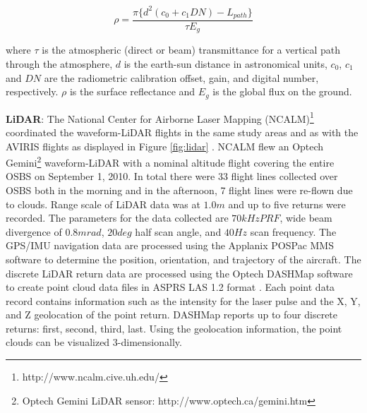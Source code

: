 \documentclass[remotesensing,article,accept,moreauthors,pdftex,12pt,a4paper]{mdpi}
\begin{document}
\begin{equation}
\rho =\frac{\pi \{ d^2 (c_0 + c_1 D N) - L_{path}\}}{\tau E_g}
\end{equation}

where $\tau$ is the atmospheric (direct or beam) transmittance for a vertical path through the atmosphere, $d$ is the earth-sun distance in astronomical units, $c_0$, $c_1$ and $ D N$ are the radiometric calibration offset, gain, and digital number, respectively. 
$\rho$ is the surface reflectance and $E_g$ is the global flux on the ground. 


\textbf{LiDAR}: The National Center for Airborne Laser Mapping (NCALM)\footnote{http://www.ncalm.cive.uh.edu/} coordinated the waveform-LiDAR flights in the same study areas and as  with the AVIRIS flights as displayed in Figure \ref{fig:lidar} \cite{neon2010aopdatarelease}. 
NCALM flew an Optech Gemini\footnote{Optech Gemini LiDAR sensor: http://www.optech.ca/gemini.htm} waveform-LiDAR with a nominal altitude flight covering the entire OSBS on September 1, 2010. 
In total there were 33 flight lines collected over OSBS both in the morning and in the afternoon, 7 flight lines were re-flown due to clouds. Range scale of LiDAR data was at $1.0 m$ and up to five returns were recorded. 
The parameters for the data collected are $70 kHz PRF$, wide beam divergence of $0.8 mrad$, $20 deg$ half scan angle, and $40 Hz$ scan frequency. 
The GPS/IMU navigation data are processed using the Applanix POSPac MMS software to determine the position, orientation, and trajectory of the aircraft. 
The discrete LiDAR return data are processed using the Optech DASHMap software to create point cloud data files in ASPRS LAS 1.2 format \cite{las12format}. 
Each point data record contains information such as the intensity for the laser pulse and the X, Y, and Z geolocation of the point return. 
DASHMap reports up to four discrete returns: first, second, third, last. 
Using the geolocation information, the point clouds can be visualized 3-dimensionally.
\end{document}
